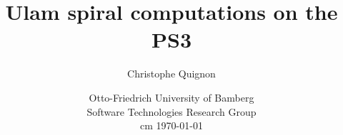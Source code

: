 \documentclass[a4paper]{article}
\begin{document}
\title{%
	Ulam spiral computations on the PS3}
\author{Christophe Quignon}
\date{Otto-Friedrich University of Bamberg\\
Software Technologies Research Group\\
 cm	
\today}

\maketitle


\noindent

%

%


%
\newpage
%
%

   
\end{document}
